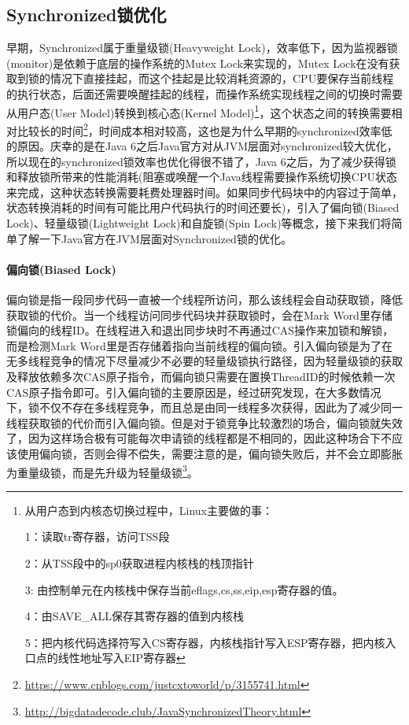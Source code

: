 \documentclass[../../../interview-questions.tex]{subfiles}
\begin{document}
\subsection{Synchronized锁优化}

早期，Synchronized属于重量级锁(Heavyweight Lock)，效率低下，因为监视器锁(monitor)是依赖于底层的操作系统的Mutex Lock来实现的，Mutex Lock在没有获取到锁的情况下直接挂起，而这个挂起是比较消耗资源的，CPU要保存当前线程的执行状态，后面还需要唤醒挂起的线程，而操作系统实现线程之间的切换时需要从用户态(User Model)转换到核心态(Kernel Model)\footnote{从用户态到内核态切换过程中，Linux主要做的事：

1：读取tr寄存器，访问TSS段

2：从TSS段中的sp0获取进程内核栈的栈顶指针

3:  由控制单元在内核栈中保存当前eflags,cs,ss,eip,esp寄存器的值。

4：由SAVE\_ALL保存其寄存器的值到内核栈

5：把内核代码选择符写入CS寄存器，内核栈指针写入ESP寄存器，把内核入口点的线性地址写入EIP寄存器}，这个状态之间的转换需要相对比较长的时间\footnote{\url{https://www.cnblogs.com/justcxtoworld/p/3155741.html}}，时间成本相对较高，这也是为什么早期的synchronized效率低的原因。庆幸的是在Java 6之后Java官方对从JVM层面对synchronized较大优化，所以现在的synchronized锁效率也优化得很不错了，Java 6之后，为了减少获得锁和释放锁所带来的性能消耗(阻塞或唤醒一个Java线程需要操作系统切换CPU状态来完成，这种状态转换需要耗费处理器时间。如果同步代码块中的内容过于简单，状态转换消耗的时间有可能比用户代码执行的时间还要长)，引入了偏向锁(Biased Lock)、轻量级锁(Lightweight Lock)和自旋锁(Spin Lock)等概念，接下来我们将简单了解一下Java官方在JVM层面对Synchronized锁的优化。

\paragraph{偏向锁(Biased Lock)}偏向锁是指一段同步代码一直被一个线程所访问，那么该线程会自动获取锁，降低获取锁的代价。当一个线程访问同步代码块并获取锁时，会在Mark Word里存储锁偏向的线程ID。在线程进入和退出同步块时不再通过CAS操作来加锁和解锁，而是检测Mark Word里是否存储着指向当前线程的偏向锁。引入偏向锁是为了在无多线程竞争的情况下尽量减少不必要的轻量级锁执行路径，因为轻量级锁的获取及释放依赖多次CAS原子指令，而偏向锁只需要在置换ThreadID的时候依赖一次CAS原子指令即可。引入偏向锁的主要原因是，经过研究发现，在大多数情况下，锁不仅不存在多线程竞争，而且总是由同一线程多次获得，因此为了减少同一线程获取锁的代价而引入偏向锁。但是对于锁竞争比较激烈的场合，偏向锁就失效了，因为这样场合极有可能每次申请锁的线程都是不相同的，因此这种场合下不应该使用偏向锁，否则会得不偿失，需要注意的是，偏向锁失败后，并不会立即膨胀为重量级锁，而是先升级为轻量级锁\footnote{\url{http://bigdatadecode.club/JavaSynchronizedTheory.html}}。
\end{document}
